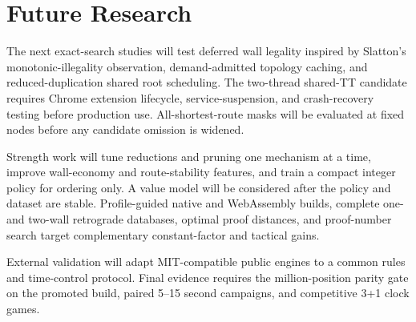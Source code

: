 \section{Future Research}
The next exact-search studies will test deferred wall legality inspired by Slatton's monotonic-illegality observation, demand-admitted topology caching, and reduced-duplication shared root scheduling. The two-thread shared-TT candidate requires Chrome extension lifecycle, service-suspension, and crash-recovery testing before production use. All-shortest-route masks will be evaluated at fixed nodes before any candidate omission is widened.

Strength work will tune reductions and pruning one mechanism at a time, improve wall-economy and route-stability features, and train a compact integer policy for ordering only. A value model will be considered after the policy and dataset are stable. Profile-guided native and WebAssembly builds, complete one- and two-wall retrograde databases, optimal proof distances, and proof-number search target complementary constant-factor and tactical gains.

External validation will adapt MIT-compatible public engines to a common rules and time-control protocol. Final evidence requires the million-position parity gate on the promoted build, paired 5--15 second campaigns, and competitive 3+1 clock games. 

